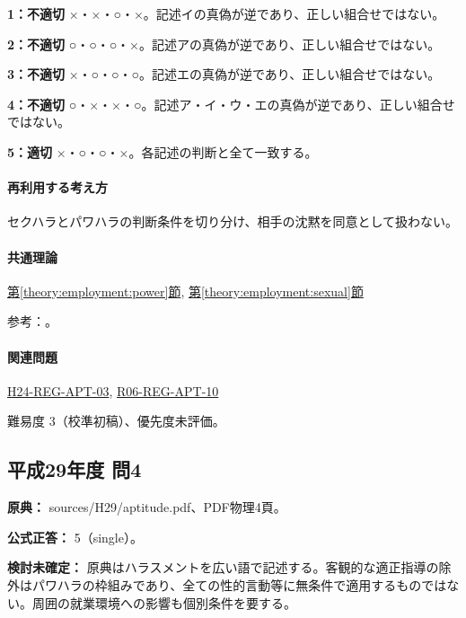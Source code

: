 \noindent\textbf{1：不適切} ×・×・○・×。記述イの真偽が逆であり、正しい組合せではない。\par

\noindent\textbf{2：不適切} ○・○・○・×。記述アの真偽が逆であり、正しい組合せではない。\par

\noindent\textbf{3：不適切} ×・○・○・○。記述エの真偽が逆であり、正しい組合せではない。\par

\noindent\textbf{4：不適切} ○・×・×・○。記述ア・イ・ウ・エの真偽が逆であり、正しい組合せではない。\par

\noindent\textbf{5：適切} ×・○・○・×。各記述の判断と全て一致する。\par

\paragraph{再利用する考え方} セクハラとパワハラの判断条件を切り分け、相手の沈黙を同意として扱わない。

\paragraph{共通理論} \hyperref[theory:employment:power]{第\ref*{theory:employment:power}節}, \hyperref[theory:employment:sexual]{第\ref*{theory:employment:sexual}節}

\par 参考：\cite{employment_power2012,employment_power_current,employment_sexual_current,employment_sexual2018}。

\paragraph{関連問題} \hyperref[q:h24-reg-apt-03]{H24-REG-APT-03}, \hyperref[q:r06-reg-apt-10]{R06-REG-APT-10}

\par 難易度 3（校準初稿）、優先度未評価。

\subsection{平成29年度 問4}
\label{q:h29-reg-apt-04}

\noindent\textbf{原典：} sources/H29/aptitude.pdf、PDF物理4頁。

\textbf{公式正答：} 5（single）。

\par\textbf{検討未確定：} 原典はハラスメントを広い語で記述する。客観的な適正指導の除外はパワハラの枠組みであり、全ての性的言動等に無条件で適用するものではない。周囲の就業環境への影響も個別条件を要する。

